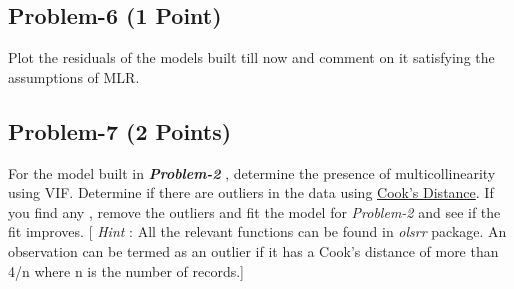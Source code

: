 \documentclass[
]{article}
\begin{document}
\hypertarget{problem-6-1-point}{%
\subsection{Problem-6 (1 Point)}\label{problem-6-1-point}}

Plot the residuals of the models built till now and comment on it
satisfying the assumptions of MLR.

\hypertarget{problem-7-2-points}{%
\subsection{Problem-7 (2 Points)}\label{problem-7-2-points}}

For the model built in \textbf{\emph{Problem-2}} , determine the
presence of multicollinearity using VIF. Determine if there are outliers
in the data using
\href{https://www.statisticshowto.com/cooks-distance/}{Cook's Distance}.
If you find any , remove the outliers and fit the model for
\emph{Problem-2} and see if the fit improves. {[} \emph{Hint} : All the
relevant functions can be found in \emph{olsrr} package. An observation
can be termed as an outlier if it has a Cook's distance of more than 4/n
where n is the number of records.{]}
\end{document}
